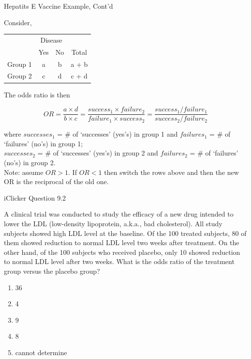 \documentclass[14pt]{beamer}\usepackage[]{graphicx}\usepackage[]{color}
\begin{document}
\begin{frame}[fragile]{Hepatits E Vaccine Example, Cont'd}

Consider, 

{\footnotesize{
\begin{table}[ht]
\centering
\begin{tabular}{@{} cccc @{}} \hline
     & \multicolumn{2}{c}{Disease} \\
     & Yes & No & Total \\ \hline
     Group 1 & a & b & a + b \\
     Group 2 & c & d & c + d \\ \hline
\end{tabular}
\end{table}

The odds ratio is then 

\begin{equation*}
OR = \frac{a \times d}{b \times c}  = \frac{ success_1 \times failure_2}{ failure_1 \times success_2} = \frac{ success_1 / failure_1}{ success_2 / failure_2  }
\end{equation*}

where $successes_1$  = \# of `successes' (yes's) in group 1 and $failures_1$ = \# of `failures' (no's) in group 1;  \\ $successes_2$ = \# of `successes' (yes's) in group 2 and  $failures_2$  = \# of `failures' (no's) in group 2. \\
Note: assume $OR > 1$. If $OR < 1$ then switch the rows above and then  the new OR is the reciprocal of the old one.
}}
\end{frame}

\begin{frame}[fragile]{iClicker Question 9.2}

{\footnotesize{
A clinical trial was conducted to study the efficacy of a new drug  intended to lower the LDL (low-density lipoprotein, a.k.a., bad  cholesterol). All study subjects showed high LDL level at the baseline.  Of the 100 treated subjects, 80 of them showed reduction to normal  LDL level two weeks after treatment. On the other hand, of the 100  subjects who received placebo, only 10 showed reduction to normal  LDL level after two weeks. What is the odds ratio of the treatment  group versus the placebo group?

\begin{enumerate}
\item 36
\item 4
\item 9
\item 8
\item cannot determine
\end{enumerate}
}}
\end{frame}
\end{document}

